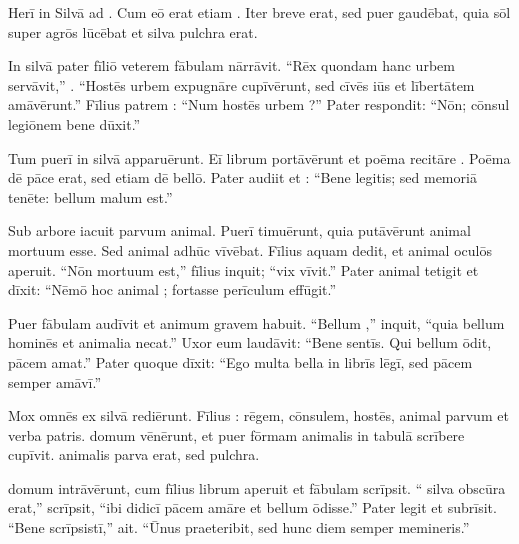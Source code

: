 \documentclass[12pt]{nextbook}
\begin{document}
\begin{readersection}{Herī in Silvā}
   ad  . Cum eō erat etiam . Iter breve erat, sed puer gaudēbat, quia sōl super agrōs lūcēbat et silva pulchra erat.

In silvā pater fīliō veterem fābulam nārrāvit. “Rēx quondam hanc urbem servāvit,” . “Hostēs urbem expugnāre cupīvērunt, sed cīvēs iūs et lībertātem amāvērunt.” Fīlius patrem : “Num hostēs urbem ?” Pater respondit: “Nōn; cōnsul legiōnem bene dūxit.”

Tum  puerī in silvā apparuērunt. Eī librum portāvērunt et poēma recitāre . Poēma dē pāce erat, sed etiam dē bellō. Pater audiit et : “Bene legitis; sed memoriā tenēte: bellum malum est.”

Sub arbore iacuit parvum animal. Puerī timuērunt, quia putāvērunt animal mortuum esse. Sed animal adhūc vīvēbat. Fīlius aquam dedit, et animal oculōs aperuit. “Nōn mortuum est,” fīlius inquit; “vix vīvit.” Pater animal tetigit et dīxit: “Nēmō hoc animal ; fortasse perīculum effūgit.”

Puer fābulam audīvit et animum gravem habuit. “Bellum ,” inquit, “quia bellum hominēs et animalia necat.” Uxor eum laudāvit: “Bene sentīs. Qui bellum ōdit, pācem amat.” Pater quoque dīxit: “Ego multa bella in librīs lēgī, sed pācem semper amāvī.”

Mox omnēs ex silvā rediērunt. Fīlius : rēgem, cōnsulem, hostēs, animal parvum et verba patris.  domum vēnērunt, et puer fōrmam animalis in tabulā scrībere cupīvit.  animalis parva erat, sed pulchra.

 domum intrāvērunt, cum fīlius librum aperuit et fābulam scrīpsit. “ silva obscūra erat,” scrīpsit, “ibi didicī pācem amāre et bellum ōdisse.” Pater legit et subrīsit. “Bene scrīpsistī,” ait. “Ūnus  praeteribit, sed hunc diem semper memineris.”

\end{readersection}
\end{document}
